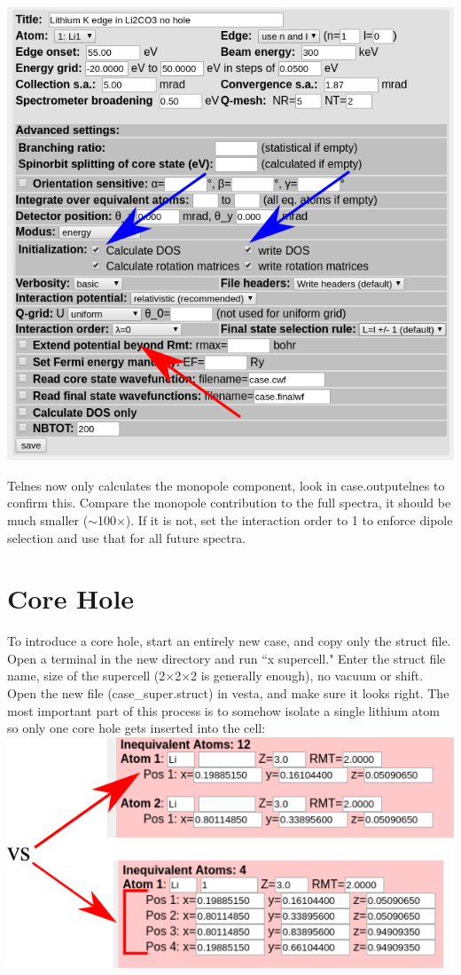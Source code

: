 \documentclass[12pt]{article}
\begin{document}
\includegraphics[scale=0.5]{./images/innes_monopole.png}

Telnes now only calculates the monopole component, look in case.outputelnes to confirm this.  Compare the monopole contribution to the full spectra, it should be much smaller ($\sim$100$\times$).  If it is not, set the interaction order to 1 to enforce dipole selection and use that for all future spectra.


\section{Core Hole}
To introduce a core hole, start an entirely new case, and copy only the struct file.  Open a terminal in the new directory and run ``x supercell." Enter the struct file name, size of the supercell (2$\times$2$\times$2 is generally enough), no vacuum or shift.  Open the new file (case\_super.struct) in vesta, and make sure it looks right. The most  important part of this process is to somehow isolate a single lithium atom so only one core hole gets inserted into the cell:\\

\includegraphics[scale=0.5]{./images/isolated_struct.png}
\end{document}
